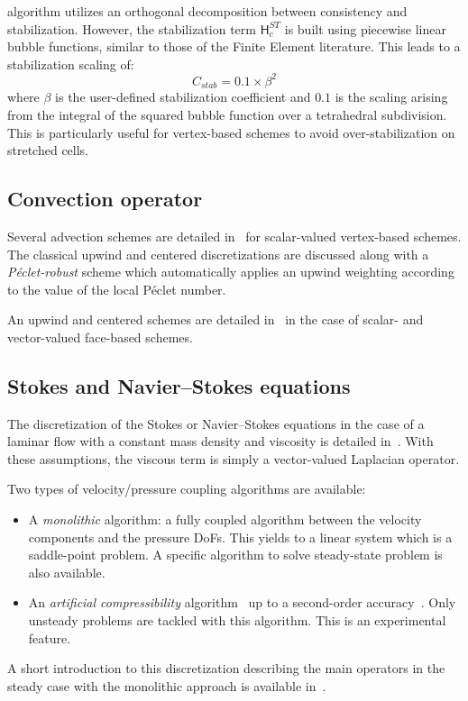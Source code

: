 \begin{itemize}
  algorithm utilizes an orthogonal decomposition between consistency and
  stabilization. However, the stabilization term $\mathsf{H}_c^{ST}$ is built
  using piecewise linear bubble functions, similar to those of the Finite
  Element literature. This leads to a stabilization scaling of:
  \begin{equation}
    C_{stab} = 0.1 \times \beta^2
  \end{equation}
  where $\beta$ is the user-defined stabilization coefficient and $0.1$ is the
  scaling arising from the integral of the squared bubble function over a
  tetrahedral subdivision. This is particularly useful for vertex-based schemes
  to avoid over-stabilization on stretched cells.
\end{itemize}



\subsection{Convection operator}

Several advection schemes are detailed in~\cite{Cant16} for scalar-valued
vertex-based schemes. The classical upwind and centered discretizations are
discussed along with a \emph{P\'eclet-robust} scheme which automatically
applies an upwind weighting according to the value of the local P\'eclet
number.

An upwind and centered schemes are detailed in~\cite{Mila20} in the case of
scalar- and vector-valued face-based schemes.

\subsection{Stokes and Navier--Stokes equations}

The discretization of the Stokes or Navier--Stokes equations in the case of a
laminar flow with a constant mass density and viscosity is detailed
in~\cite{Mila20}. With these assumptions, the viscous term is simply a
vector-valued Laplacian operator.

Two types of velocity/pressure coupling algorithms are available:
\begin{itemize}
\item A \emph{monolithic} algorithm: a fully coupled algorithm between the
  velocity components and the pressure DoFs. This yields to a linear system
  which is a saddle-point problem. A specific algorithm to solve steady-state
  problem is also available.
\item An \emph{artificial compressibility} algorithm~\cite{GuMi15} up to a
  second-order accuracy~\cite{MiBoE22}. Only unsteady problems are tackled with this
  algorithm. This is an experimental feature.
\end{itemize}

A short introduction to this discretization describing the main operators in
the steady case with the monolithic approach is available in~\cite{BoErM20}.


